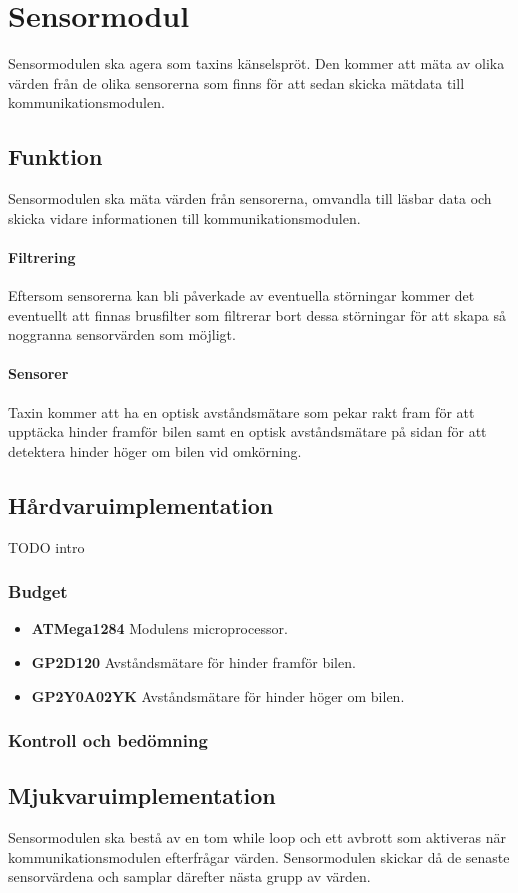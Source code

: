 \documentclass[designspec/spec.tex]{subfiles}
\begin{document}
\section{Sensormodul}
Sensormodulen ska agera som taxins känselspröt. Den kommer att mäta av olika
värden från de olika sensorerna som finns för att sedan skicka mätdata till
kommunikationsmodulen.

\subsection{Funktion}
Sensormodulen ska mäta värden från sensorerna, omvandla till läsbar data och
skicka vidare informationen till kommunikationsmodulen.

\paragraph{Filtrering}
Eftersom sensorerna kan bli påverkade av eventuella störningar kommer det
eventuellt att finnas brusfilter som filtrerar bort dessa störningar för att
skapa så noggranna sensorvärden som möjligt.

\paragraph{Sensorer}
Taxin kommer att ha en optisk avståndsmätare som pekar rakt fram för att
upptäcka hinder framför bilen samt en optisk avståndsmätare på sidan för att
detektera hinder höger om bilen vid omkörning.

\subsection{Hårdvaruimplementation} 
TODO intro

\subsubsection{Budget}

\begin{itemize}
	\item \textbf{ATMega1284} Modulens microprocessor. 
    \item \textbf{GP2D120} Avståndsmätare för hinder framför bilen.
    \item \textbf{GP2Y0A02YK} Avståndsmätare för hinder höger om bilen.
\end{itemize}

\subsubsection{Kontroll och bedömning}

\subsection{Mjukvaruimplementation} 
Sensormodulen ska bestå av en tom while loop och ett avbrott som aktiveras när
kommunikationsmodulen efterfrågar värden. Sensormodulen skickar då de senaste
sensorvärdena och samplar därefter nästa grupp av värden.
\end{document}
